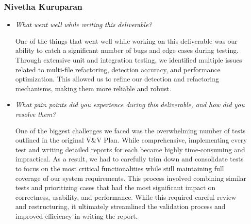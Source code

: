 \documentclass[12pt, titlepage]{article}
\begin{document}
\subsubsection*{Nivetha Kuruparan}
\begin{itemize}
  \item \textit{What went well while writing this deliverable?}

    One of the things that went well while working on this
    deliverable was our ability to catch a significant number of bugs
    and edge cases during testing. Through extensive unit and
    integration testing, we identified multiple issues related to
    multi-file refactoring, detection accuracy, and performance
    optimization. This allowed us to refine our detection and
    refactoring mechanisms, making them more reliable and robust.

  \item \textit{What pain points did you experience during this
    deliverable, and how did you resolve them?}

    One of the biggest challenges we faced was the overwhelming
    number of tests outlined in the original V\&V Plan. While
    comprehensive, implementing every test and writing detailed
    reports for each became highly time-consuming and impractical. As
    a result, we had to carefully trim down and consolidate tests to
    focus on the most critical functionalities while still
    maintaining full coverage of our system requirements. This
    process involved combining similar tests and prioritizing cases
    that had the most significant impact on correctness, usability,
    and performance. While this required careful review and
    restructuring, it ultimately streamlined the validation process
    and improved efficiency in writing the report.
\end{itemize}
\end{document}
